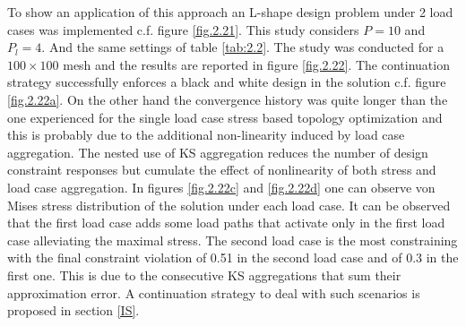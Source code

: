 To show an application of this approach an L-shape design problem under 2 load cases was implemented c.f. figure \ref{fig.2.21}.
This study considers $P=10$ and $P_l=4$. And the same settings of table \ref{tab:2.2}. The study was conducted for a $100\times100$ mesh and the results are reported in figure \ref{fig.2.22}. The continuation strategy successfully enforces a black and white design in the solution c.f. figure \ref{fig.2.22a}. On the other hand the convergence history was quite longer than the one experienced for the single load case stress based topology optimization and this is probably due to the additional non-linearity induced by load case aggregation. The nested use of KS aggregation reduces the number of design constraint responses but cumulate the effect of nonlinearity of both stress and load case aggregation. In figures \ref{fig.2.22c}  and \ref{fig.2.22d} one can observe von Mises stress distribution of the solution under each load case. It can be observed that the first load case adds some load paths that activate only in the first load case alleviating the maximal stress.
The second load case is the most constraining with the final constraint violation of 0.51 in the second load case and of 0.3 in the first one. This is due to the consecutive KS aggregations that sum their approximation error. A continuation strategy to deal with such scenarios is proposed in section \ref{IS}.


